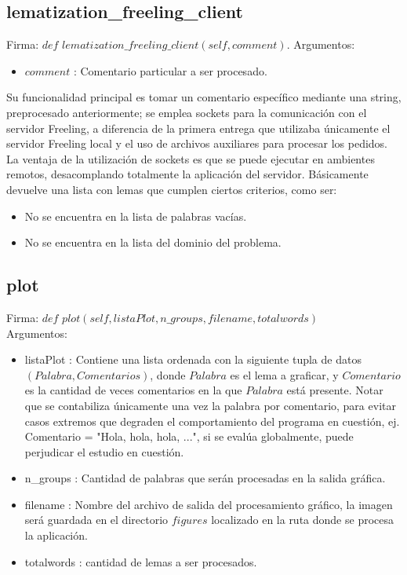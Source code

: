 \documentclass[12pt]{article}
\begin{document}
\subsection{lematization\_freeling\_client}
Firma: $def$ $lematization\_freeling\_client(self, comment)$.
Argumentos:
\begin{itemize}
  \item $comment$ : Comentario particular a ser procesado.
\end{itemize}
Su funcionalidad principal es tomar un comentario específico mediante una string, preprocesado anteriormente; se emplea sockets para la comunicación con el servidor Freeling, a diferencia de la primera entrega que utilizaba únicamente el servidor Freeling local y el uso de archivos auxiliares para procesar los pedidos. La ventaja de la utilización de sockets es que se puede ejecutar en ambientes remotos, desacomplando totalmente la aplicación del servidor. Básicamente devuelve una lista con lemas que cumplen ciertos criterios, como ser:
\begin{itemize}
  \item No se encuentra en la lista de palabras vacías.
  \item No se encuentra en la lista del dominio del problema.
\end{itemize}


\subsection{plot} \label{func:plot}
Firma: $def$ $plot(self, listaPlot, n\_groups, filename, totalwords)$ \\
Argumentos:
\begin{itemize}
  \item listaPlot : Contiene una lista ordenada con la siguiente tupla de datos $(Palabra, Comentarios)$, donde $Palabra$ es el lema a graficar, y $Comentario$ es la cantidad de veces comentarios en la que $Palabra$ está presente. Notar que se contabiliza únicamente una vez la palabra por comentario, para evitar casos extremos que degraden el comportamiento del programa en cuestión, ej. Comentario = "Hola, hola, hola, ...", si se evalúa globalmente, puede perjudicar el estudio en cuestión.
  \item n\_groups : Cantidad de palabras que serán procesadas en la salida gráfica.
  \item filename : Nombre del archivo de salida del procesamiento gráfico, la imagen será guardada en el directorio $figures$ localizado en la ruta donde se procesa la aplicación.
  \item totalwords : cantidad de lemas a ser procesados.
\end{itemize}
\end{document}
